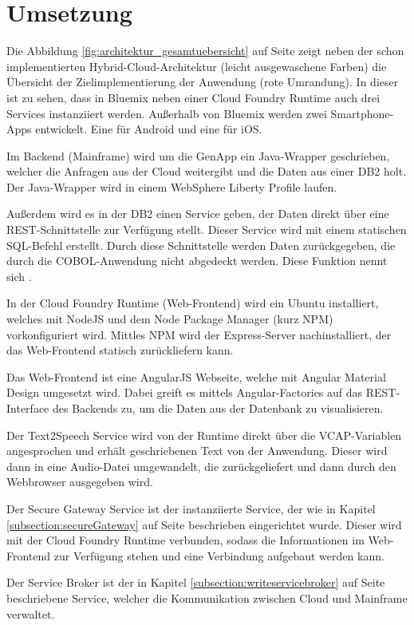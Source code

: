 \section{Umsetzung}
Die Abbildung \ref{fig:architektur_gesamtuebersicht} auf Seite \pageref{fig:architektur_gesamtuebersicht} zeigt neben der
schon implementierten Hybrid-Cloud-Architektur (leicht ausgewaschene Farben) die Übersicht der Zielimplementierung der
Anwendung (rote Umrandung). In dieser ist zu sehen, dass in Bluemix neben einer Cloud Foundry Runtime auch drei Services
instanziiert werden. Außerhalb von Bluemix werden zwei Smartphone-Apps entwickelt. Eine für Android und eine für iOS.

Im Backend (Mainframe) wird um die GenApp ein Java-Wrapper geschrieben, welcher die Anfragen aus der Cloud weitergibt und
die Daten aus einer DB2 holt. Der Java-Wrapper wird in einem WebSphere Liberty Profile laufen.

Außerdem wird es in der DB2 einen Service geben, der Daten direkt über eine REST-Schnittstelle zur Verfügung stellt. Dieser
Service wird mit einem statischen SQL-Befehl erstellt. Durch diese Schnittstelle werden Daten zurückgegeben, die durch
die COBOL-Anwendung nicht abgedeckt werden. Diese Funktion nennt sich .

In der Cloud Foundry Runtime (Web-Frontend) wird ein Ubuntu installiert, welches mit NodeJS und dem Node Package Manager
(kurz NPM) vorkonfiguriert wird. Mittles NPM wird der Express-Server nachinstalliert, der das Web-Frontend statisch
zurückliefern kann.

Das Web-Frontend ist eine AngularJS Webseite, welche mit Angular Material Design umgesetzt wird. Dabei greift es mittels
Angular-Factories auf das REST-Interface des Backends zu, um die Daten aus der Datenbank zu visualisieren.

Der Text2Speech Service wird von der Runtime direkt über die VCAP-Variablen angesprochen und erhält geschriebenen Text
von der Anwendung. Dieser wird dann in eine Audio-Datei umgewandelt, die zurückgeliefert und dann durch den Webbrowser
ausgegeben wird.

Der Secure Gateway Service ist der instanziierte Service, der wie in Kapitel \ref{subsection:secureGateway} auf Seite
\pageref{subsection:secureGateway} beschrieben eingerichtet wurde. Dieser wird mit der Cloud Foundry Runtime verbunden,
sodass die Informationen im Web-Frontend zur Verfügung stehen und eine Verbindung aufgebaut werden kann.

Der Service Broker ist der in Kapitel \ref{subsection:writeservicebroker} auf Seite \pageref{subsection:writeservicebroker}
beschriebene Service, welcher die Kommunikation zwischen Cloud und Mainframe verwaltet.

